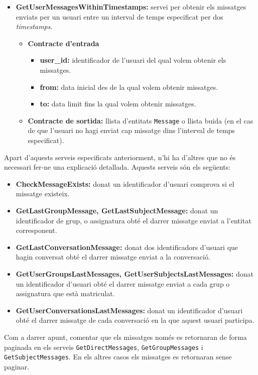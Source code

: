 \begin{itemize}
			\item \textbf{GetUserMessagesWithinTimestamps:} servei per obtenir els missatges enviats per un usuari entre un interval de temps especificat per dos \emph{timestamps}.
			
				\begin{itemize}
					\item \textbf{Contracte d'entrada}
						\begin{itemize}
							\item \textbf{user\_id:} identificador de l'usuari del qual volem obtenir els missatges.
							\item \textbf{from:} data inicial des de la qual volem obtenir missatges.
							\item \textbf{to:} data limit fins la qual volem obtenir missatges.
						\end{itemize}
					\item \textbf{Contracte de sortida:} llista d'entitats \texttt{Message} o llista buida (en el cas de que l'usuari no hagi enviat cap missatge dins l'interval de temps especificat).
			\end{itemize}
		\end{itemize}
		
	Apart d'aquests serveis especificats anteriorment, n'hi ha d'altres que no és necessari fer-ne una explicació detallada. Aquests serveis són els següents:
	
	\begin{itemize}
		\item \textbf{CheckMessageExists:} donat un identificador d'usuari comprova si el missatge existeix.
		\item \textbf{GetLastGroupMessage, GetLastSubjectMessage:} donat un identificador de grup, o assignatura obté el darrer missatge enviat a l'entitat corresponent.
		\item \textbf{GetLastConversationMessage:} donat dos identificadors d'usuari que hagin conversat obté el darrer missatge enviat a la conversació.
		\item \textbf{GetUserGroupsLastMessages, GetUserSubjectsLastMessages:} donat un identificador d'usuari obté el darrer missatge enviat a cada grup o assignatura que està matriculat.
		\item \textbf{GetUserConversationsLastMessages:} donat un identificador d'usuari obté el darrer missatge de cada conversació en la que aquest usuari participa.
	\end{itemize}
	
	Com a darrer apunt, comentar que els missatges només es retornaran de forma paginada en els serveis \texttt{GetDirectMessages}, \texttt{GetGroupMessages} i \texttt{GetSubjectMessages}. En els altres casos els missatges es retornaran sense paginar.
